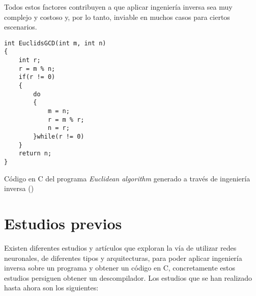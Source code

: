 Todos estos factores contribuyen a que aplicar ingeniería inversa sea muy complejo y costoso y, por
lo tanto, inviable en muchos casos para ciertos escenarios.

\begin{mycode}
    \begin{verbatim}
int EuclidsGCD(int m, int n)
{
    int r;
    r = m % n;
    if(r != 0) 
    {
        do
        {
            m = n;
            r = m % r;
            n = r;
        }while(r != 0)
    }
    return n;
}
    \end{verbatim}
    \caption[Código en C del programa \textit{Euclidean algorithm} generado a través de ingeniería inversa]{Código en C del programa \textit{Euclidean algorithm} generado a través de ingeniería inversa (\cite{EuclidianCode})}
    \label{cod:EuclidianCodeIng}
\end{mycode}

\section{Estudios previos}
\label{sec:estudios_previos}


Existen diferentes estudios y artículos que exploran la vía de utilizar redes neuronales,
de diferentes tipos y arquitecturas, para poder aplicar ingeniería inversa sobre un programa
y obtener un código en C, concretamente estos estudios persiguen obtener un descompilador.
Los estudios que se han realizado hasta ahora son los siguientes:

